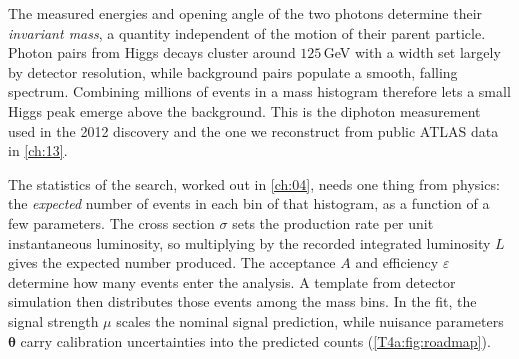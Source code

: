 The measured energies and opening angle of the two photons determine their \emph{invariant mass}, a quantity independent of the motion of their parent particle. Photon pairs from Higgs decays cluster around $125$\,GeV with a width set largely by detector resolution, while background pairs populate a smooth, falling spectrum. Combining millions of events in a mass histogram therefore lets a small Higgs peak emerge above the background. This is the diphoton measurement used in the 2012 discovery and the one we reconstruct from public ATLAS data in \cref{ch:13}.

The statistics of the search, worked out in \cref{ch:04}, needs one thing from physics: the \emph{expected} number of events in each bin of that histogram, as a function of a few parameters. The cross section $\sigma$ sets the production rate per unit instantaneous luminosity, so multiplying by the recorded integrated luminosity $L$ gives the expected number produced. The acceptance $A$ and efficiency $\varepsilon$ determine how many events enter the analysis. A template from detector simulation then distributes those events among the mass bins. In the fit, the signal strength $\mu$ scales the nominal signal prediction, while nuisance parameters $\bm\theta$ carry calibration uncertainties into the predicted counts (\cref{T4a:fig:roadmap}).

